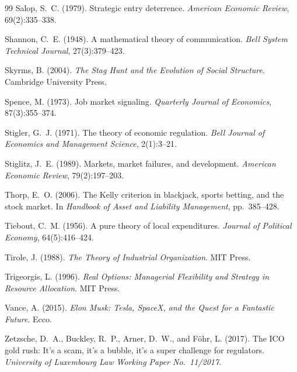 \documentclass[12pt,a4paper,oneside]{book}
\theoremstyle{definition}
\theoremstyle{remark}
\begin{document}
\begin{thebibliography}{99}
Salop, S.~C. (1979).
\newblock Strategic entry deterrence.
\newblock \textit{American Economic Review}, 69(2):335--338.

Shannon, C.~E. (1948).
\newblock A mathematical theory of communication.
\newblock \textit{Bell System Technical Journal}, 27(3):379--423.

Skyrms, B. (2004).
\newblock \textit{The Stag Hunt and the Evolution of Social Structure}.
\newblock Cambridge University Press.

Spence, M. (1973).
\newblock Job market signaling.
\newblock \textit{Quarterly Journal of Economics}, 87(3):355--374.

Stigler, G.~J. (1971).
\newblock The theory of economic regulation.
\newblock \textit{Bell Journal of Economics and Management Science}, 2(1):3--21.

Stiglitz, J.~E. (1989).
\newblock Markets, market failures, and development.
\newblock \textit{American Economic Review}, 79(2):197--203.

Thorp, E.~O. (2006).
\newblock The {K}elly criterion in blackjack, sports betting, and the stock market.
\newblock In \textit{Handbook of Asset and Liability Management}, pp.~385--428.

Tiebout, C.~M. (1956).
\newblock A pure theory of local expenditures.
\newblock \textit{Journal of Political Economy}, 64(5):416--424.

Tirole, J. (1988).
\newblock \textit{The Theory of Industrial Organization}.
\newblock MIT Press.

Trigeorgis, L. (1996).
\newblock \textit{Real Options: Managerial Flexibility and Strategy in Resource Allocation}.
\newblock MIT Press.

Vance, A. (2015).
\newblock \textit{Elon Musk: Tesla, SpaceX, and the Quest for a Fantastic Future}.
\newblock Ecco.

Zetzsche, D.~A., Buckley, R.~P., Arner, D.~W., and F\"{o}hr, L. (2017).
\newblock The {ICO} gold rush: It's a scam, it's a bubble, it's a super
  challenge for regulators.
\newblock \textit{University of Luxembourg Law Working Paper No.~11/2017}.

\end{thebibliography}
\end{document}
